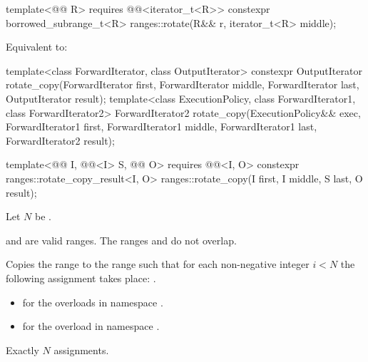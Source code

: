 \begin{itemdecl}
template<@@ R>
  requires @@<iterator_t<R>>
  constexpr borrowed_subrange_t<R> ranges::rotate(R&& r, iterator_t<R> middle);
\end{itemdecl}

\begin{itemdescr}
\pnum
\effects
Equivalent to:
\end{itemdescr}

%
\begin{itemdecl}
template<class ForwardIterator, class OutputIterator>
  constexpr OutputIterator
    rotate_copy(ForwardIterator first, ForwardIterator middle, ForwardIterator last,
                OutputIterator result);
template<class ExecutionPolicy, class ForwardIterator1, class ForwardIterator2>
  ForwardIterator2
    rotate_copy(ExecutionPolicy&& exec,
                ForwardIterator1 first, ForwardIterator1 middle, ForwardIterator1 last,
                ForwardIterator2 result);

  template<@@ I, @@<I> S, @@ O>
    requires @@<I, O>
    constexpr ranges::rotate_copy_result<I, O>
      ranges::rotate_copy(I first, I middle, S last, O result);
\end{itemdecl}

\begin{itemdescr}
\pnum
Let $N$ be .

\pnum
\expects
{} and  are valid ranges.
The ranges  and 
do not overlap.

\pnum
\effects
Copies the range  to the range 
such that for each non-negative integer $i < N$
the following assignment takes place:
.

\pnum
\returns
\begin{itemize}
\item
   for the overloads in namespace .
\item
   for the overload in namespace .
\end{itemize}

\pnum
\complexity
Exactly $N$ assignments.
\end{itemdescr}

